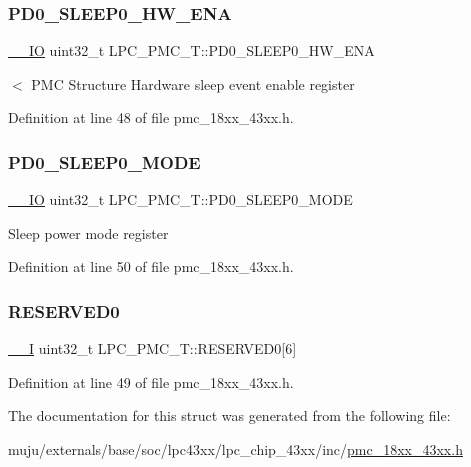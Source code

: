 \subsubsection{\texorpdfstring{P\+D0\+\_\+\+S\+L\+E\+E\+P0\+\_\+\+H\+W\+\_\+\+E\+NA}{PD0\_SLEEP0\_HW\_ENA}}
{\footnotesize\ttfamily \hyperlink{core__sc300_8h_aec43007d9998a0a0e01faede4133d6be}{\+\_\+\+\_\+\+IO} uint32\+\_\+t L\+P\+C\+\_\+\+P\+M\+C\+\_\+\+T\+::\+P\+D0\+\_\+\+S\+L\+E\+E\+P0\+\_\+\+H\+W\+\_\+\+E\+NA}

$<$ P\+MC Structure Hardware sleep event enable register 

Definition at line 48 of file pmc\+\_\+18xx\+\_\+43xx.\+h.

\mbox{\label{struct_l_p_c___p_m_c___t_aa7e6af3a03da05230646526186461f48}} 
\subsubsection{\texorpdfstring{P\+D0\+\_\+\+S\+L\+E\+E\+P0\+\_\+\+M\+O\+DE}{PD0\_SLEEP0\_MODE}}
{\footnotesize\ttfamily \hyperlink{core__sc300_8h_aec43007d9998a0a0e01faede4133d6be}{\+\_\+\+\_\+\+IO} uint32\+\_\+t L\+P\+C\+\_\+\+P\+M\+C\+\_\+\+T\+::\+P\+D0\+\_\+\+S\+L\+E\+E\+P0\+\_\+\+M\+O\+DE}

Sleep power mode register 

Definition at line 50 of file pmc\+\_\+18xx\+\_\+43xx.\+h.

\mbox{\label{struct_l_p_c___p_m_c___t_adb3df3ecce2ea8154b410ce505b42354}} 
\subsubsection{\texorpdfstring{R\+E\+S\+E\+R\+V\+E\+D0}{RESERVED0}}
{\footnotesize\ttfamily \hyperlink{core__sc300_8h_af63697ed9952cc71e1225efe205f6cd3}{\+\_\+\+\_\+I} uint32\+\_\+t L\+P\+C\+\_\+\+P\+M\+C\+\_\+\+T\+::\+R\+E\+S\+E\+R\+V\+E\+D0\mbox{[}6\mbox{]}}



Definition at line 49 of file pmc\+\_\+18xx\+\_\+43xx.\+h.



The documentation for this struct was generated from the following file\+:\begin{DoxyCompactItemize}
\item 
muju/externals/base/soc/lpc43xx/lpc\+\_\+chip\+\_\+43xx/inc/\hyperlink{pmc__18xx__43xx_8h}{pmc\+\_\+18xx\+\_\+43xx.\+h}\end{DoxyCompactItemize}
